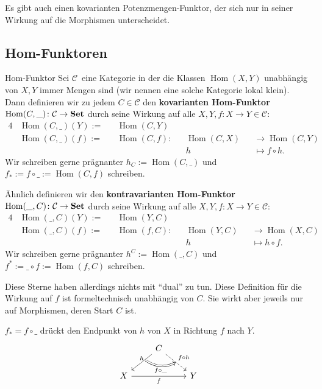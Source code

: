 \documentclass[a4paper]{amsart}
\theoremstyle{definition}
\DeclareMathOperator{\Hom}{Hom}
\newcommand{\CC}{\ensuremath{\mathcal{ C }}}
\newcommand{\Set}{\text{\textbf{Set}}}
\begin{document}
Es gibt auch einen kovarianten Potenzmengen-Funktor, der sich nur in seiner Wirkung  auf die Morphismen unterscheidet.

\subsection{Hom-Funktoren}
\begin{Definition}{Hom-Funktor}
   Sei \CC\ eine Kategorie in der die Klassen $\Hom(X,Y)$ unabhängig von $X,Y$ immer Mengen sind (wir nennen eine solche Kategorie lokal klein). Dann definieren wir zu jedem $C \in \CC$ den \textbf{kovarianten Hom-Funktor} $\Hom(C, \_) \colon \CC \to \Set$ durch seine Wirkung auf alle $X,Y, f \colon X \to Y \in \CC$:
   \begin{alignat}{4}
      &\Hom(C, \_)( Y ) := &&\Hom(C, Y)\\
      &\Hom(C, \_)( f ) := &&\Hom(C, f ) \colon &&\Hom(C, X ) &&\to \Hom(C, Y )\\
      &                    &&                   &&h           &&\mapsto f \circ h.
   \end{alignat}
   Wir schreiben gerne prägnanter $h_C := \Hom(C, \_)$ und  $f_* := f \circ \_ := \Hom(C, f )$ schreiben.
   
   Ähnlich definieren wir den \textbf{kontravarianten Hom-Funktor} $\Hom(\_, C) \colon \CC \to \Set$ durch seine Wirkung auf alle $X,Y, f \colon X \to Y \in \CC$:
   \begin{alignat}{4}
      &\Hom(\_, C)( Y ) := &&\Hom(Y, C)\\
      &\Hom(\_, C)( f ) := &&\Hom( f, C ) \colon &&\Hom(Y, C ) &&\to \Hom(X, C )\\
      &                    &&                   &&h           &&\mapsto h \circ f.
   \end{alignat}
   Wir schreiben gerne prägnanter $h^C := \Hom(\_, C)$ und  $f^* := \_ \circ f := \Hom( f, C )$ schreiben.
\end{Definition}   
Diese Sterne haben allerdings nichts mit "`dual"' zu tun. Diese Definition für die Wirkung auf $f$ ist formeltechnisch unabhängig von $C$. Sie wirkt aber jeweils nur auf Morphismen, deren Start $C$ ist.

$f_* = f \circ \_$ drückt den Endpunkt von $h$ von $X$ in Richtung $f$ nach $Y$.
\begin{equation}
   \begin{tikzcd}
                         &C   \arrow[dl, "h"{above, name=0}] \arrow[dr, dashed, "f \circ h"{name=1}] \\
      X \arrow[rr, "f"{below}]  &        &Y
      \arrow[Rightarrow, bend right, from=0, to=1, "f \circ \_"{below}]
   \end{tikzcd}
\end{equation}
\end{document}
